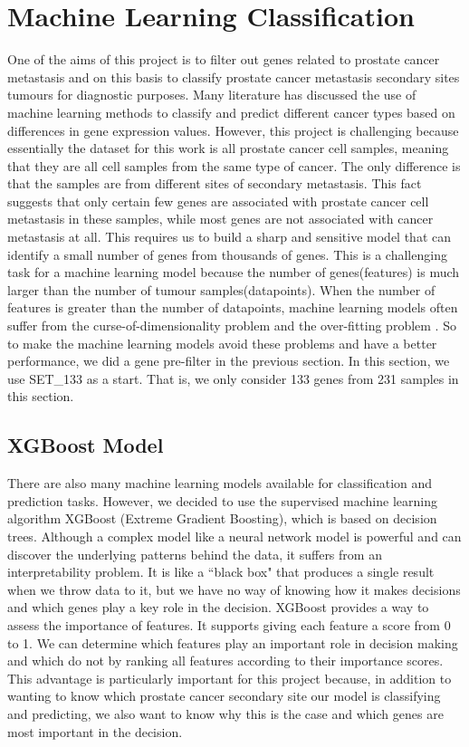 \documentclass[12pt,a4paper]{report}
\begin{document}
\chapter{Machine Learning Classification}
One of the aims of this project is to filter out genes related to prostate cancer metastasis and on this basis to classify prostate cancer metastasis secondary sites tumours for diagnostic purposes. Many literature has discussed the use of machine learning methods to classify and predict different cancer types based on differences in gene expression values. However, this project is challenging because essentially the dataset for this work is all prostate cancer cell samples, meaning that they are all cell samples from the same type of cancer. The only difference is that the samples are from different sites of secondary metastasis. This fact suggests that only certain few genes are associated with prostate cancer cell metastasis in these samples, while most genes are not associated with cancer metastasis at all. This requires us to build a sharp and sensitive model that can identify a small number of genes from thousands of genes. This is a challenging task for a machine learning model because the number of genes(features) is much larger than the number of tumour samples(datapoints). When the number of features is greater than the number of datapoints, machine learning models often suffer from the curse-of-dimensionality problem \cite{Bel57} and the over-fitting problem \cite{Tet95}. So to make the machine learning models avoid these problems and have a better performance, we did a gene pre-filter in the previous section. In this section, we use SET\_133 as a start. That is, we only consider 133 genes from 231 samples in this section.\\

\section{XGBoost Model}
There are also many machine learning models available for classification and prediction tasks. However, we decided to use the supervised machine learning algorithm XGBoost (Extreme Gradient Boosting), which is based on decision trees. Although a complex model like a neural network model is powerful and can discover the underlying patterns behind the data, it suffers from an interpretability problem. It is like a ``black box" that produces a single result when we throw data to it, but we have no way of knowing how it makes decisions and which genes play a key role in the decision. XGBoost provides a way to assess the importance of features. It supports giving each feature a score from 0 to 1. We can determine which features play an important role in decision making and which do not by ranking all features according to their importance scores. This advantage is particularly important for this project because, in addition to wanting to know which prostate cancer secondary site our model is classifying and predicting, we also want to know why this is the case and which genes are most important in the decision.\\
\end{document}
